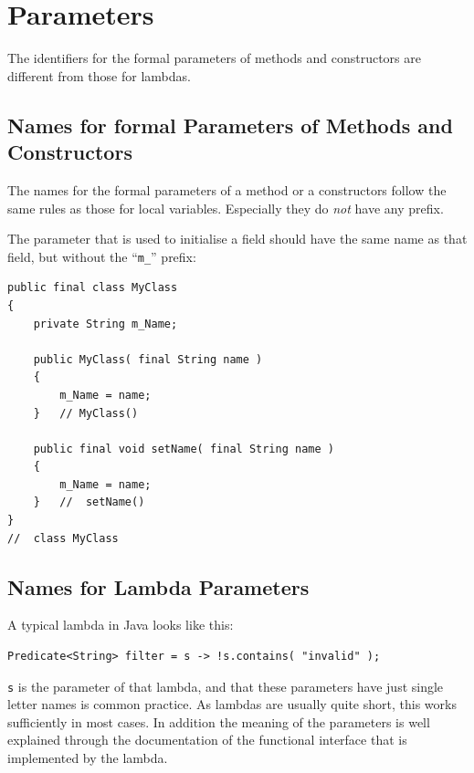 \documentclass[11pt,a4paper, titlepage, parskip=half, headsepline, footsepline, cleardoublepage=current, headheight=1cm]{scrbook}
\begin{document}

\section{Parameters}
The identifiers for the formal parameters of methods and constructors are different from those for lambdas.


\subsection{Names for formal Parameters of Methods and Constructors}\label{sec:NamesForFormalParameters}
The names for the formal parameters of a method or a constructors follow the same rules as those for local variables. Especially they do \textit{not} have any prefix.

The parameter that is used to initialise a field should have the same name as that field, but without the “\verb#m_#” prefix:
\begin{lstlisting}
public final class MyClass
{
    private String m_Name;
    
    public MyClass( final String name )
    {
        m_Name = name;
    }   // MyClass()
    
    public final void setName( final String name )
    {
        m_Name = name;
    }   //  setName()
}
//  class MyClass
\end{lstlisting}


\subsection{Names for Lambda Parameters}\label{sec:NamesForLambdaParameters}
A typical lambda in Java looks like this:
\begin{lstlisting}
Predicate<String> filter = s -> !s.contains( "invalid" );
\end{lstlisting}
\lstinline|s| is the parameter of that lambda, and that these parameters have just single letter names is common practice. As lambdas are usually quite short, this works sufficiently in most cases. In addition the meaning of the parameters is well explained through the documentation of the functional interface that is implemented by the lambda.
\end{document}

